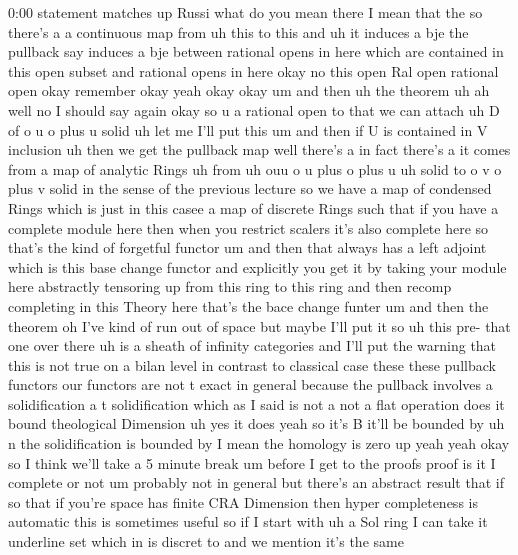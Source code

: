 \begin{unfinished}{0:00}
statement  matches  up  Russi  what  do  you
mean  there  I  mean  that  the  so  there's  a
a  continuous  map
from  uh  this  to
this  and  uh  it  induces  a  bje  the
pullback  say  induces  a  bje  between
rational  opens  in  here  which  are
contained  in  this  open  subset  and
rational  opens  in
here  okay  no  this  open  Ral  open  rational
open  okay  remember  okay  yeah
okay
okay  um  and  then
uh  the  theorem  uh  ah  well  no  I  should
say  again  okay  so  u  a  rational
open  to  that  we  can  attach  uh  D  of  o  u  o
plus  u
solid  uh  let  me  I'll  put
this  um  and  then  if  U  is  contained  in  V
inclusion  uh  then  we  get  the  pullback
map  well  there's  a  in  fact  there's  a  it
comes  from  a  map  of  analytic
Rings  uh  from
uh  ouu  o  u  plus  o  plus  u  uh  solid  to  o  v
o  plus  v  solid  in  the  sense  of  the
previous  lecture  so  we  have  a  map  of
condensed  Rings  which  is  just  in  this
casee  a  map  of  discrete  Rings  such  that
if  you  have  a  complete  module  here  then
when  you  restrict  scalers  it's  also
complete  here  so  that's  the  kind  of
forgetful  functor  um  and  then  that
always  has  a  left  adjoint  which  is  this
base  change  functor  and  explicitly  you
get  it  by  taking  your  module  here
abstractly  tensoring  up  from  this  ring
to  this  ring  and  then  recomp  completing
in  this  Theory  here  that's  the  bace
change
funter
um
and  then  the  theorem  oh  I've  kind  of  run
out  of  space  but  maybe  I'll  put
it
so  uh  this
pre-  that  one  over  there  uh  is  a
sheath  of  infinity
categories  and  I'll  put  the  warning  that
this  is  not  true  on  a  bilan
level  in
contrast  to
classical  case  these  these  pullback
functors  our  functors  are  not  t
exact  in
general
because  the  pullback  involves  a
solidification  a  t  solidification  which
as  I  said  is  not  a  not  a  flat
operation  does  it  bound  theological
Dimension  uh  yes  it  does  yeah  so  it's  B
it'll  be  bounded  by  uh
n  the  solidification  is  bounded  by  I
mean  the  homology  is  zero  up  yeah
yeah  okay  so  I  think  we'll  take  a  5
minute  break  um  before  I  get  to  the
proofs
proof  is  it  I  complete  or  not  um
probably  not  in  general  but  there's  an
abstract  result  that  if  so  that  if
you're  space  has  finite  CRA  Dimension
then  hyper  completeness  is  automatic
this  is  sometimes
useful  so  if  I  start  with  uh  a  Sol  ring
I  can  take  it  underline  set  which  in  is
discret  to  and  we  mention  it's  the  same

\end{unfinished}

